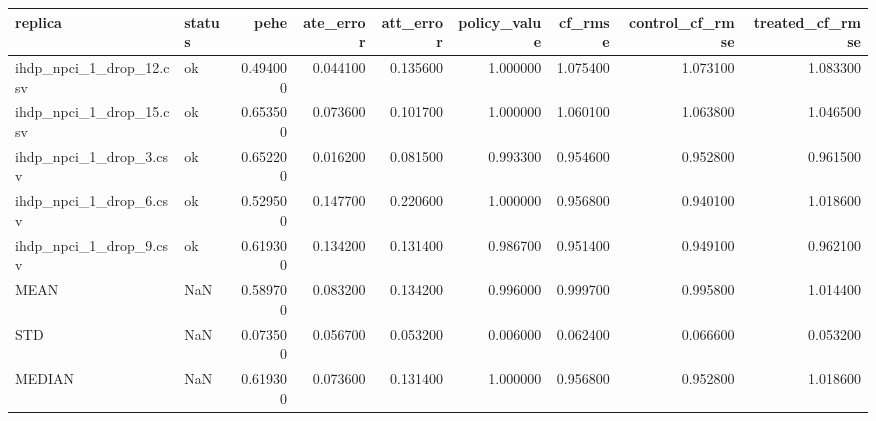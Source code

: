 \begin{tabular}{llrrrrrrr}
\toprule
replica & status & pehe & ate_error & att_error & policy_value & cf_rmse & control_cf_rmse & treated_cf_rmse \\
\midrule
ihdp_npci_1_drop_12.csv & ok & 0.494000 & 0.044100 & 0.135600 & 1.000000 & 1.075400 & 1.073100 & 1.083300 \\
ihdp_npci_1_drop_15.csv & ok & 0.653500 & 0.073600 & 0.101700 & 1.000000 & 1.060100 & 1.063800 & 1.046500 \\
ihdp_npci_1_drop_3.csv & ok & 0.652200 & 0.016200 & 0.081500 & 0.993300 & 0.954600 & 0.952800 & 0.961500 \\
ihdp_npci_1_drop_6.csv & ok & 0.529500 & 0.147700 & 0.220600 & 1.000000 & 0.956800 & 0.940100 & 1.018600 \\
ihdp_npci_1_drop_9.csv & ok & 0.619300 & 0.134200 & 0.131400 & 0.986700 & 0.951400 & 0.949100 & 0.962100 \\
MEAN & NaN & 0.589700 & 0.083200 & 0.134200 & 0.996000 & 0.999700 & 0.995800 & 1.014400 \\
STD & NaN & 0.073500 & 0.056700 & 0.053200 & 0.006000 & 0.062400 & 0.066600 & 0.053200 \\
MEDIAN & NaN & 0.619300 & 0.073600 & 0.131400 & 1.000000 & 0.956800 & 0.952800 & 1.018600 \\
\bottomrule
\end{tabular}
